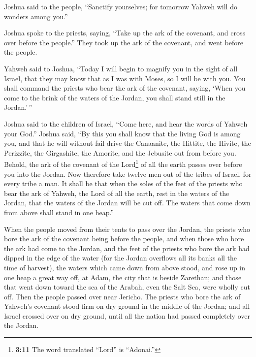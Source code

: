 \begin{paracol}{2}
\begin{otherlanguage}{english}
 Joshua said to the people, ``Sanctify yourselves; for
tomorrow Yahweh will do wonders among you.''

 Joshua spoke to the priests, saying, ``Take up the ark of
the covenant, and cross over before the people.'' They took up the ark
of the covenant, and went before the people.

 Yahweh said to Joshua, ``Today I will begin to magnify
you in the sight of all Israel, that they may know that as I was with
Moses, so I will be with you.  You shall command the
priests who bear the ark of the covenant, saying, `When you come to the
brink of the waters of the Jordan, you shall stand still in the
Jordan.'\,''

 Joshua said to the children of Israel, ``Come here, and
hear the words of Yahweh your God.''  Joshua said, ``By
this you shall know that the living God is among you, and that he will
without fail drive the Canaanite, the Hittite, the Hivite, the
Perizzite, the Girgashite, the Amorite, and the Jebusite out from before
you.  Behold, the ark of the covenant of the
Lord\footnote{\textbf{3:11} The word translated ``Lord'' is ``Adonai.''}
of all the earth passes over before you into the Jordan. 
Now therefore take twelve men out of the tribes of Israel, for every
tribe a man.  It shall be that when the soles of the feet
of the priests who bear the ark of Yahweh, the Lord of all the earth,
rest in the waters of the Jordan, that the waters of the Jordan will be
cut off. The waters that come down from above shall stand in one heap.''

 When the people moved from their tents to pass over the
Jordan, the priests who bore the ark of the covenant being before the
people,  and when those who bore the ark had come to the
Jordan, and the feet of the priests who bore the ark had dipped in the
edge of the water (for the Jordan overflows all its banks all the time
of harvest),  the waters which came down from above
stood, and rose up in one heap a great way off, at Adam, the city that
is beside Zarethan; and those that went down toward the sea of the
Arabah, even the Salt Sea, were wholly cut off. Then the people passed
over near Jericho.  The priests who bore the ark of
Yahweh's covenant stood firm on dry ground in the middle of the Jordan;
and all Israel crossed over on dry ground, until all the nation had
passed completely over the Jordan.


\end{otherlanguage}
\end{paracol}

